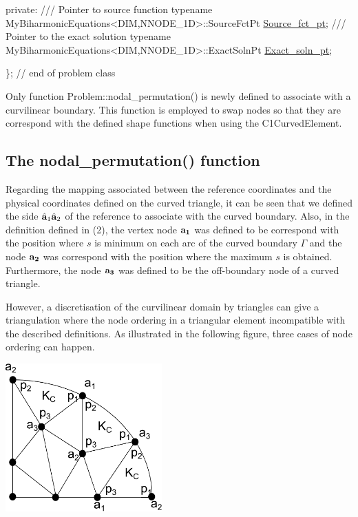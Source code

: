 \begin{DoxyCodeInclude}
\textcolor{keyword}{private}:
\textcolor{comment}{}
\textcolor{comment}{ /// Pointer to source function}
\textcolor{comment}{} \textcolor{keyword}{typename} MyBiharmonicEquations<DIM,NNODE\_1D>::SourceFctPt \hyperlink{classMyBiharmonicProblem_a1ba6c64955d32e319db7a7de7807458a}{Source\_fct\_pt};
\textcolor{comment}{}
\textcolor{comment}{ /// Pointer to the exact solution}
\textcolor{comment}{} \textcolor{keyword}{typename} MyBiharmonicEquations<DIM,NNODE\_1D>::ExactSolnPt \hyperlink{classMyBiharmonicProblem_a9f681412ab2041bf3ddcd668ee816362}{Exact\_soln\_pt};

\}; \textcolor{comment}{// end of problem class}

\end{DoxyCodeInclude}


Only function {\ttfamily Problem\+::nodal\+\_\+permutation()} is newly defined to associate with a curvilinear boundary. This function is employed to swap nodes so that they are correspond with the defined shape functions when using the {\ttfamily C1\+Curved\+Element}.



\hypertarget{index_permute}{}\subsection{The nodal\+\_\+permutation() function}\label{index_permute}
Regarding the mapping associated between the reference coordinates and the physical coordinates defined on the curved triangle, it can be seen that we defined the side $ \hat{\bf{a}}_1\hat{\bf{a}}_2$ of the reference to associate with the curved boundary. Also, in the definition defined in (2), the vertex node $ \bf{a}_1 $ was defined to be correspond with the position where $ s $ is minimum on each arc of the curved boundary $ \Gamma $ and the node $ \bf{a}_2 $ was correspond with the position where the maximum $ s $ is obtained. Furthermore, the node $ \bf{a}_3 $ was defined to be the off-\/boundary node of a curved triangle.

However, a discretisation of the curvilinear domain by triangles can give a triangulation where the node ordering in a triangular element incompatible with the described definitions. As illustrated in the following figure, three cases of node ordering can happen.

 
\begin{DoxyImage}
\includegraphics[width=0.45\textwidth]{node_ordering}
\end{DoxyImage}


